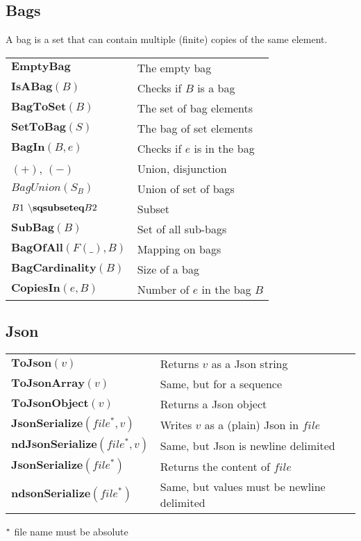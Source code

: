 \documentclass[10pt,landscape]{article}
\begin{document}
\begin{multicols}{3}
{    \subsection{Bags}
    A bag is a set that can contain multiple (finite) copies of the same
    element.
    \begin{tabular}{p{}|p{}}
      $\textbf{EmptyBag}$ & The empty bag \\
      $\textbf{IsABag}(B)$ & Checks if $B$ is a bag\\
      $\textbf{BagToSet}(B)$ & The set of bag elements\\
      $\textbf{SetToBag}(S)$ & The bag of set elements\\
      $\textbf{BagIn}(B,e)$ & Checks if $e$ is in the bag\\
      $(+)$, $(-)$ & Union, disjunction\\
      $BagUnion(S_B)$ & Union of set of bags\\
      $B1 \textbf{$~\backslash$sqsubseteq} B2$ & Subset\\
      $\textbf{SubBag}(B)$ & Set of all sub-bags\\
      $\textbf{BagOfAll}(F(\_), B)$ & Mapping on bags\\
      $\textbf{BagCardinality}(B)$ & Size of a bag\\
      $\textbf{CopiesIn}(e, B)$ & Number of $e$ in the bag $B$
    \end{tabular}
    \subsection{Json}
    \begin{tabular}{p{}|p{}}
      $\textbf{ToJson}(v)$ & Returns $v$ as a Json string\\
      $\textbf{ToJsonArray}(v)$ & Same, but for a sequence\\
      $\textbf{ToJsonObject}(v)$ & Returns a Json object\\
      $\textbf{JsonSerialize}(file^*, v)$ & Writes $v$ as a (plain) Json in $file$\\
      $\textbf{ndJsonSerialize}(file^*, v)$ & Same, but Json is newline delimited\\
      $\textbf{JsonSerialize}(file^*)$ & Returns the content of $file$\\
      $\textbf{ndsonSerialize}(file^*)$ & Same, but values must be newline delimited\\
    \end{tabular}
    $\null^*$ file name must be absolute
  }
\end{multicols}
\end{document}
